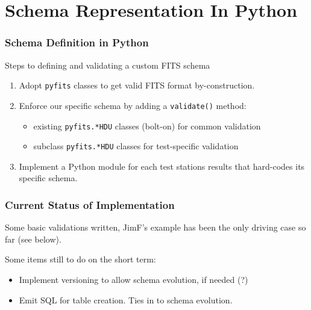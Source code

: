 \documentclass[xcolor=dvipsnames]{beamer}
\begin{document}
\section{Schema Representation In Python}

\begin{frame}
  \frametitle{Schema Definition in Python}

  Steps to defining and validating a custom FITS schema
  \begin{enumerate}
  \item Adopt \texttt{pyfits} classes to get valid FITS format by-construction.
  \item Enforce our specific schema by adding a \texttt{validate()} method:
    \begin{itemize}
    \item existing \texttt{pyfits.*HDU} classes (bolt-on) for common validation
    \item subclass \texttt{pyfits.*HDU} classes for test-specific validation
    \end{itemize}
  \item Implement a Python module for each test stations results that
    hard-codes its specific schema.
  \end{enumerate}

\end{frame}

\begin{frame}
  \frametitle{Current Status of Implementation}

  Some basic validations written, JimF's example has been the only driving
  case so far (see below).

  \vspace{2mm}

  Some items still to do on the short term:

  \begin{itemize}
  \item Implement versioning to allow schema evolution, if needed (?)
  \item Emit SQL for table creation.  Ties in to schema evolution.
  \end{itemize}

\end{frame}
\end{document}
